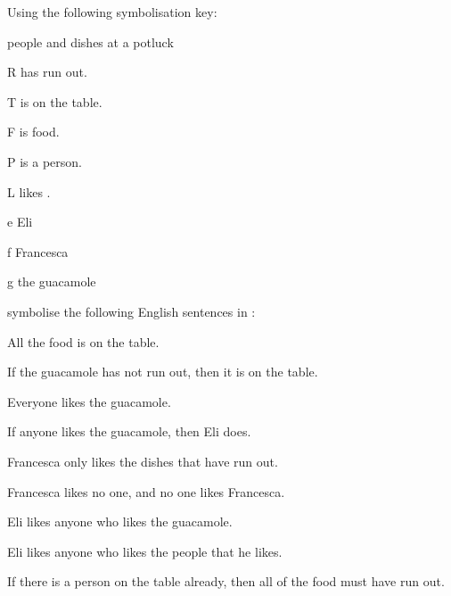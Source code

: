 \problempart
Using the following symbolisation key:
\begin{ekey}
\item[\text{domain}] people and dishes at a potluck
\item[R]  has run out.
\item[T]  is on the table.
\item[F]  is food.
\item[P]  is a person.
\item[L]  likes .
\item[e] Eli
\item[f] Francesca
\item[g] the guacamole
\end{ekey}
symbolise the following English sentences in \FOL:
\begin{earg}
\item All the food is on the table.
\item If the guacamole has not run out, then it is on the table.
\item Everyone likes the guacamole.
\item If anyone likes the guacamole, then Eli does.
\item Francesca only likes the dishes that have run out.
\item Francesca likes no one, and no one likes Francesca.
\item Eli likes anyone who likes the guacamole.
\item Eli likes anyone who likes the people that he likes.
\item If there is a person on the table already, then all of the food must have run out.
\end{earg}


